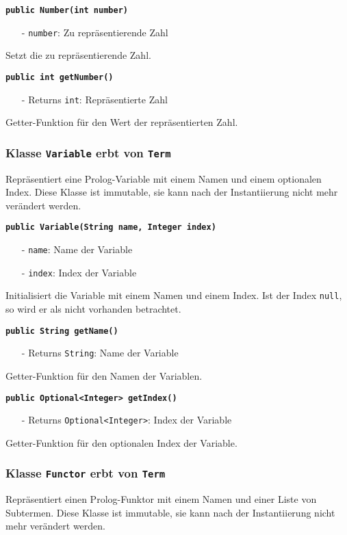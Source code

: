 \documentclass[parskip=full,11pt,twoside]{scrartcl}
\begin{document}
\textbf{\texttt{public Number(int number)}}
\begin{itemize}[noitemsep]
	\item[-] \texttt{number}: Zu repräsentierende Zahl
\end{itemize}
Setzt die zu repräsentierende Zahl.

\textbf{\texttt{public int getNumber()}}
\begin{itemize}[noitemsep]
	\item[-] Returns \texttt{int}: Repräsentierte Zahl
\end{itemize}
Getter-Funktion für den Wert der repräsentierten Zahl.

\subsubsection{Klasse \texttt{Variable} erbt von \texttt{Term}}
Repräsentiert eine Prolog-Variable mit einem Namen und einem optionalen Index. Diese Klasse ist immutable, sie kann nach der Instantiierung nicht mehr verändert werden.

\textbf{\texttt{public Variable(String name, Integer index)}}
\begin{itemize}[noitemsep]
	\item[-] \texttt{name}: Name der Variable
	\item[-] \texttt{index}: Index der Variable
\end{itemize}
Initialisiert die Variable mit einem Namen und einem Index. Ist der Index \texttt{null}, so wird er als nicht vorhanden betrachtet.

\textbf{\texttt{public String getName()}}
\begin{itemize}[noitemsep]
	\item[-] Returns \texttt{String}: Name der Variable
\end{itemize}
Getter-Funktion für den Namen der Variablen.

\textbf{\texttt{public Optional<Integer> getIndex()}}
\begin{itemize}[noitemsep]
	\item[-] Returns \texttt{Optional<Integer>}: Index der Variable
\end{itemize}
Getter-Funktion für den optionalen Index der Variable.

\subsubsection{Klasse \texttt{Functor} erbt von \texttt{Term}}
Repräsentiert einen Prolog-Funktor mit einem Namen und einer Liste von Subtermen. Diese Klasse ist immutable, sie kann nach der Instantiierung nicht mehr verändert werden.
\end{document}
